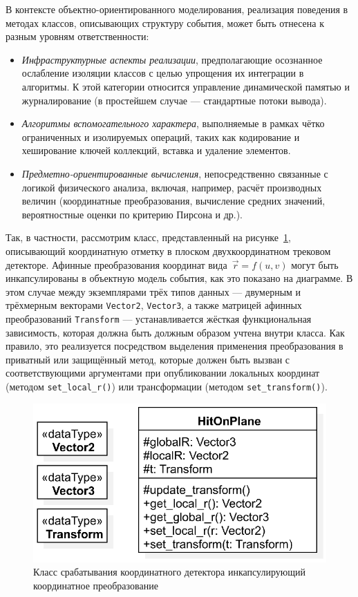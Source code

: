 В контексте объектно-ориентированного моделирования,
реализация поведения в методах классов, описывающих структуру события,
может быть отнесена к разным уровням ответственности:

\begin{itemize}
    \item \emph{Инфраструктурные аспекты реализации}, предполагающие
    осознанное ослабление изоляции классов с целью упрощения их интеграции
    в алгоритмы. К этой категории относится управление динамической памятью
    и журналирование (в простейшем случае --- стандартные потоки вывода).
    \item \emph{Алгоритмы вспомогательного характера}, выполняемые
    в рамках чётко ограниченных и изолируемых операций, таких как кодирование
    и хеширование ключей коллекций, вставка и удаление элементов.
    \item \emph{Предметно-ориентированные вычисления}, непосредственно
    связанные с логикой физического анализа, включая, например, расчёт
    производных величин (координатные преобразования, вычисление средних значений,
    вероятностные оценки по критерию Пирсона и др.).
\end{itemize}

Так, в частности, рассмотрим класс, представленный на рисунке~\ref{fig:complex-class},
описывающий координатную отметку в плоском
двухкоординатном трековом детекторе. Афинные преобразования координат
вида~$\vec{r} = f(u, v)$ могут быть инкапсулированы в объектную модель события,
как это показано на диаграмме. В этом случае между экземплярами трёх типов
данных --- двумерным и трёхмерным векторами \texttt{Vector2}, \texttt{Vector3},
а также матрицей афинных преобразований \texttt{Transform} --- устанавливается жёсткая
функциональная зависимость, которая должна быть должным образом учтена
внутри класса. Как правило, это реализуется посредством выделения
применения преобразования в приватный или защищённый метод, которые должен быть
вызван с соответствующими аргументами при опубликовании локальных координат
(методом \texttt{set\_local\_r()}) или трансформации (методом \texttt{set\_transform()}).

\begin{figure}[ht!]
    \centering
    \includegraphics[width=0.45\linewidth]{images/illustrative/complex-hit-class.eps}
    \caption{Класс срабатывания координатного детектора инкапсулирующий координатное преобразование}
    \label{fig:complex-class}
\end{figure}

